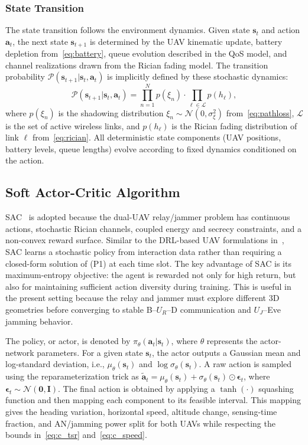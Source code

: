 \documentclass[journal]{IEEEtran}
\begin{document}
\subsubsection{State Transition}
The state transition follows the environment dynamics. Given state $\mathbf{s}_t$ and action $\mathbf{a}_t$, the next state $\mathbf{s}_{t+1}$ is determined by the UAV kinematic update, battery depletion from~\eqref{eq:battery}, queue evolution described in the QoS model, and channel realizations drawn from the Rician fading model. The transition probability $\mathcal{P}(\mathbf{s}_{t+1} | \mathbf{s}_t, \mathbf{a}_t)$ is implicitly defined by these stochastic dynamics:
\begin{equation}
\mathcal{P}(\mathbf{s}_{t+1} | \mathbf{s}_t, \mathbf{a}_t) = \prod_{n=1}^{N} p(\xi_n) \cdot \prod_{\ell\in\mathcal{L}} p(h_{\ell}),
\label{eq:transition}
\end{equation}
where $p(\xi_n)$ is the shadowing distribution $\xi_n \sim \mathcal{N}(0, \sigma_\xi^2)$ from~\eqref{eq:pathloss}, $\mathcal{L}$ is the set of active wireless links, and $p(h_{\ell})$ is the Rician fading distribution of link $\ell$ from~\eqref{eq:rician}. All deterministic state components (UAV positions, battery levels, queue lengths) evolve according to fixed dynamics conditioned on the action.

\subsection{Soft Actor-Critic Algorithm}
SAC~\cite{haarnoja2018sac} is adopted because the dual-UAV relay/jammer problem has continuous actions, stochastic Rician channels, coupled energy and secrecy constraints, and a non-convex reward surface. Similar to the DRL-based UAV formulations in~\cite{pandeyaoidrl2025, pandeystarris2026, pandeydualuav2026}, SAC learns a stochastic policy from interaction data rather than requiring a closed-form solution of (P1) at each time slot. The key advantage of SAC is its maximum-entropy objective: the agent is rewarded not only for high return, but also for maintaining sufficient action diversity during training. This is useful in the present setting because the relay and jammer must explore different 3D geometries before converging to stable B--$U_R$--D communication and $U_J$--Eve jamming behavior.

The policy, or actor, is denoted by $\pi_\theta(\mathbf{a}_t|\mathbf{s}_t)$, where $\theta$ represents the actor-network parameters. For a given state $\mathbf{s}_t$, the actor outputs a Gaussian mean and log-standard deviation, i.e., $\mu_\theta(\mathbf{s}_t)$ and $\log\sigma_\theta(\mathbf{s}_t)$. A raw action is sampled using the reparameterization trick as $\tilde{\mathbf{a}}_t=\mu_\theta(\mathbf{s}_t)+\sigma_\theta(\mathbf{s}_t)\odot\boldsymbol{\epsilon}_t$, where $\boldsymbol{\epsilon}_t\sim\mathcal{N}(\mathbf{0},\mathbf{I})$. The final action is obtained by applying a $\tanh(\cdot)$ squashing function and then mapping each component to its feasible interval. This mapping gives the heading variation, horizontal speed, altitude change, sensing-time fraction, and AN/jamming power split for both UAVs while respecting the bounds in~\eqref{eq:c_tsr} and~\eqref{eq:c_speed}.
\end{document}
